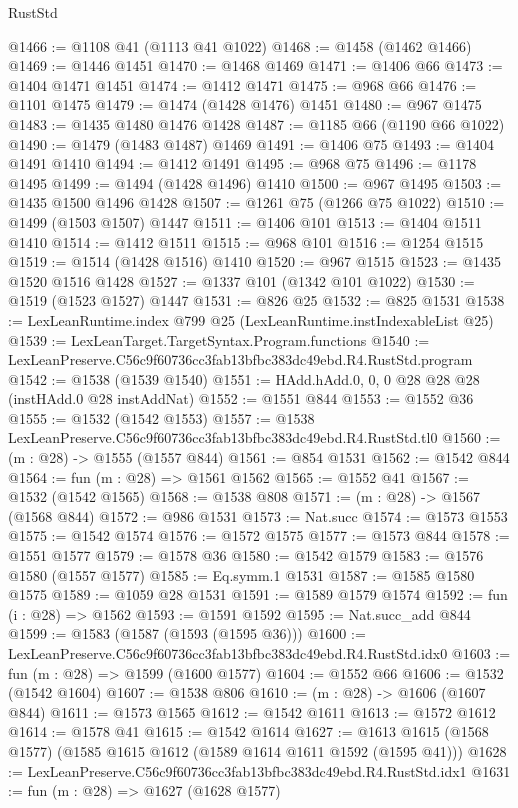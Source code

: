 \begin{lexlean}{RustStd}
\begin{coremodule}
@1466 := @1108 @41 (@1113 @41 @1022)
@1468 := @1458 (@1462 @1466)
@1469 := @1446 @1451
@1470 := @1468 @1469
@1471 := @1406 @66
@1473 := @1404 @1471 @1451
@1474 := @1412 @1471
@1475 := @968 @66
@1476 := @1101 @1475
@1479 := @1474 (@1428 @1476) @1451
@1480 := @967 @1475
@1483 := @1435 @1480 @1476 @1428
@1487 := @1185 @66 (@1190 @66 @1022)
@1490 := @1479 (@1483 @1487) @1469
@1491 := @1406 @75
@1493 := @1404 @1491 @1410
@1494 := @1412 @1491
@1495 := @968 @75
@1496 := @1178 @1495
@1499 := @1494 (@1428 @1496) @1410
@1500 := @967 @1495
@1503 := @1435 @1500 @1496 @1428
@1507 := @1261 @75 (@1266 @75 @1022)
@1510 := @1499 (@1503 @1507) @1447
@1511 := @1406 @101
@1513 := @1404 @1511 @1410
@1514 := @1412 @1511
@1515 := @968 @101
@1516 := @1254 @1515
@1519 := @1514 (@1428 @1516) @1410
@1520 := @967 @1515
@1523 := @1435 @1520 @1516 @1428
@1527 := @1337 @101 (@1342 @101 @1022)
@1530 := @1519 (@1523 @1527) @1447
@1531 := @826 @25
@1532 := @825 @1531
@1538 := LexLeanRuntime.index @799 @25 (LexLeanRuntime.instIndexableList @25)
@1539 := LexLeanTarget.TargetSyntax.Program.functions
@1540 := LexLeanPreserve.C56c9f60736cc3fab13bfbc383dc49ebd.R4.RustStd.program
@1542 := @1538 (@1539 @1540)
@1551 := HAdd.hAdd.{0, 0, 0} @28 @28 @28 (instHAdd.{0} @28 instAddNat)
@1552 := @1551 @844
@1553 := @1552 @36
@1555 := @1532 (@1542 @1553)
@1557 := @1538 LexLeanPreserve.C56c9f60736cc3fab13bfbc383dc49ebd.R4.RustStd.tl0
@1560 := (m : @28) -> @1555 (@1557 @844)
@1561 := @854 @1531
@1562 := @1542 @844
@1564 := fun (m : @28) => @1561 @1562
@1565 := @1552 @41
@1567 := @1532 (@1542 @1565)
@1568 := @1538 @808
@1571 := (m : @28) -> @1567 (@1568 @844)
@1572 := @986 @1531
@1573 := Nat.succ
@1574 := @1573 @1553
@1575 := @1542 @1574
@1576 := @1572 @1575
@1577 := @1573 @844
@1578 := @1551 @1577
@1579 := @1578 @36
@1580 := @1542 @1579
@1583 := @1576 @1580 (@1557 @1577)
@1585 := Eq.symm.{1} @1531
@1587 := @1585 @1580 @1575
@1589 := @1059 @28 @1531
@1591 := @1589 @1579 @1574
@1592 := fun (i : @28) => @1562
@1593 := @1591 @1592
@1595 := Nat.succ_add @844
@1599 := @1583 (@1587 (@1593 (@1595 @36)))
@1600 := LexLeanPreserve.C56c9f60736cc3fab13bfbc383dc49ebd.R4.RustStd.idx0
@1603 := fun (m : @28) => @1599 (@1600 @1577)
@1604 := @1552 @66
@1606 := @1532 (@1542 @1604)
@1607 := @1538 @806
@1610 := (m : @28) -> @1606 (@1607 @844)
@1611 := @1573 @1565
@1612 := @1542 @1611
@1613 := @1572 @1612
@1614 := @1578 @41
@1615 := @1542 @1614
@1627 := @1613 @1615 (@1568 @1577) (@1585 @1615 @1612 (@1589 @1614 @1611 @1592 (@1595 @41)))
@1628 := LexLeanPreserve.C56c9f60736cc3fab13bfbc383dc49ebd.R4.RustStd.idx1
@1631 := fun (m : @28) => @1627 (@1628 @1577)

\end{coremodule}
\end{lexlean}
